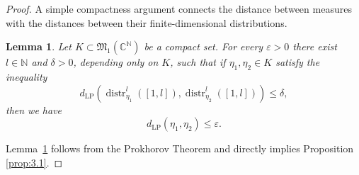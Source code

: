 \documentclass[10pt,a4paper]{amsart}
\newtheorem{lemma}{Lemma}
\newcommand{\MM}{{\mathfrak{M}}}
\begin{document}
	\begin{proof}
		A  simple compactness argument  connects the distance between measures with
		the distances between their finite-dimensional distributions.
		
		\begin{lemma}
			\label{lem:3.2}
			Let $K \subset \MM_1(\mathbb{C}^{\mathbb{N}})$ be a compact set. For every $\varepsilon > 0$ there exist $l \in \mathbb{N}$
			and $\delta > 0$, depending only on $K$, such that
			if $\eta_1, \eta_2 \in K$ satisfy the inequality
			\[
			d_{\mathrm{LP}}(\operatorname{distr}^l_{\eta_1}([1, l]), \operatorname{distr}^l_{\eta_2}([1, l])) \le \delta,
			\]
			then  we have $$d_{\mathrm{LP}}(\eta_1, \eta_2) \le \varepsilon.$$
		\end{lemma}
		
		Lemma~\ref{lem:3.2} follows  from the Prokhorov Theorem and  directly implies Proposition \ref{prop:3.1}.
		\end{proof}
\end{document}
